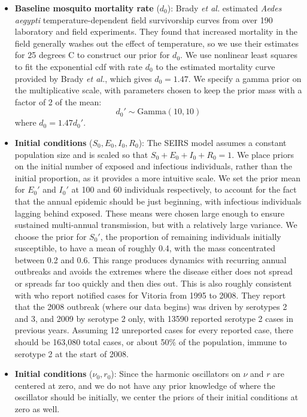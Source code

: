 \documentclass[12pt,letterpaper]{article}
\begin{document}
\begin{itemize}
\\
\item \textbf{Baseline mosquito mortality rate} ($d_0$): Brady \textit{et al.} \cite{Brady2013} estimated \textit{Aedes aegypti} temperature-dependent field survivorship curves from over 190 laboratory and field experiments.
They found that increased mortality in the field generally washes out the effect of temperature, so we use their estimates for 25 degrees C to construct our prior for $d_0$.  
We use nonlinear least squares to fit the exponential cdf with rate $d_0$ to the estimated mortality curve provided by Brady \textit{et al.}, which gives $d_0 = 1.47$.
We specify a gamma prior on the multiplicative scale, with parameters chosen to keep the prior mass with a factor of 2 of the mean:
\begin{equation}
d_0' \sim \text{Gamma}(10, 10)
\end{equation}
where $d_0 = 1.47d_0'$.
\\
\item \textbf{Initial conditions} ($S_0, E_0, I_0, R_0$): The SEIRS model assumes a constant population size and is scaled so that $S_0+E_0+I_0+R_0 = 1$.
We place priors on the initial number of exposed and infectious individuals, rather than the initial proportion, as it provides a more intuitive scale.
We set the prior mean for $E_0'$ and $I_0'$ at 100 and 60 individuals respectively, to account for the fact that the annual epidemic should be just beginning, with infectious individuals lagging behind exposed.
These means were chosen large enough to ensure sustained multi-annual transmission, but with a relatively large variance.
We choose the prior for $S_0'$, the proportion of remaining individuals initially susceptible, to have a mean of roughly  0.4, with the mass concentrated between 0.2 and 0.6.
This range produces dynamics with recurring annual outbreaks and avoids the extremes where the disease either does not spread or spreads far too quickly and then dies out.
This is also roughly consistent with \cite{Cardoso2011a} who report notified cases for Vitoria from 1995 to 2008. 
They report that the 2008 outbreak (where our data begins) was driven by serotypes 2 and 3, and 2009 by serotype 2 only, with 13590 reported serotype 2 cases in previous years.
Assuming 12 unreported cases for every reported case, there should be 163,080 total cases, or about 50\% of the population, immune to serotype 2 at the start of 2008.
\\
\item \textbf{Initial conditions} ($\nu_0, r_0$): Since the harmonic oscillators on $\nu$ and $r$ are centered at zero, and we do not have any prior knowledge of where the oscillator should be initially, we center the priors of their initial conditions at zero as well.  

\end{itemize}
\end{document}
